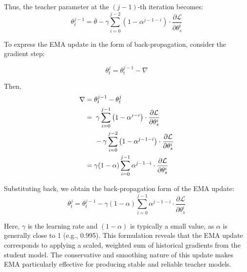Thus, the teacher parameter at the $(j{-}1)$-th iteration becomes:
\begin{equation}
\theta^{j-1}_t = \bar{\theta} - \gamma \sum_{i=0}^{j-2}\left(1 - \alpha^{j-1-i}\right) \cdot \frac{\partial \mathcal{L}}{\partial \theta_s^i}
\end{equation}

To express the EMA update in the form of back-propagation, consider the gradient step:

$$
\theta_t^j = \theta_t^{j-1} - \nabla
$$

Then,
\begin{align}
\nabla &= \theta_t^{j-1} - \theta_t^j \nonumber \\
&= \hspace{1mm} \gamma \sum_{i=0}^{j-1}\left(1 - \alpha^{j-i}\right) \cdot \frac{\partial \mathcal{L}}{\partial \theta_s^i} \\ 
& \hspace{5mm} - \gamma \sum_{i=0}^{j-2}\left(1 - \alpha^{j-1-i}\right) \cdot \frac{\partial \mathcal{L}}{\partial \theta_s^i} \nonumber\\
&= \gamma (1 - \alpha) \sum_{i=0}^{j-1} \alpha^{j-1-i} \cdot \frac{\partial \mathcal{L}}{\partial \theta_s^i}
\end{align}

Substituting back, we obtain the back-propagation form of the EMA update:
\begin{equation}
\theta^j_t = \theta^{j-1}_t - \gamma (1 - \alpha) \sum_{i=0}^{j-1} \alpha^{j-1-i} \cdot \frac{\partial \mathcal{L}}{\partial \theta_s^i}
\end{equation}

Here, $\gamma$ is the learning rate and $(1 - \alpha)$ is typically a small value, as $\alpha$ is generally close to 1 (e.g., 0.995). This formulation reveals that the EMA update corresponds to applying a scaled, weighted sum of historical gradients from the student model. The conservative and smoothing nature of this update makes EMA particularly effective for producing stable and reliable teacher models.



